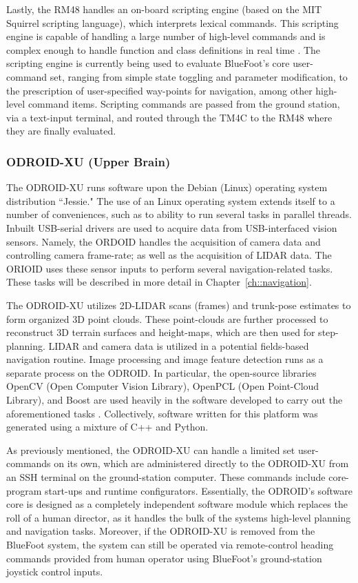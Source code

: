 			Lastly, the RM48 handles an on-board scripting engine (based on the MIT Squirrel scripting language), which interprets lexical commands. This scripting engine is capable of handling a large number of high-level commands and is complex enough to handle function and class definitions in real time \cite{Squirrel_website}. The scripting engine is currently being used to evaluate BlueFoot's core user-command set, ranging from simple state toggling and parameter modification, to the prescription of user-specified way-points for navigation, among other high-level command items. Scripting commands are passed from the ground station, via a text-input terminal, and routed through the TM4C to the RM48 where they are finally evaluated.

		\subsubsection{ODROID-XU (Upper Brain)}

			The ODROID-XU runs software upon the Debian (Linux) operating system distribution ``Jessie." The use of an Linux operating system extends itself to a number of conveniences, such as to ability to run several tasks in parallel threads. Inbuilt USB-serial drivers are used to acquire data from USB-interfaced vision sensors. Namely, the ORDOID handles the acquisition of camera data and controlling camera frame-rate; as well as the acquisition of LIDAR data. The ORIOID uses these sensor inputs to perform several navigation-related tasks. These tasks will be described in more detail in Chapter~\ref{ch::navigation}.

			The ODROID-XU utilizes 2D-LIDAR scans (frames) and trunk-pose estimates to form organized 3D point clouds. These point-clouds are further processed to reconstruct 3D terrain surfaces and height-maps, which are then used for step-planning. LIDAR and camera data is utilized in a potential fields-based navigation routine. Image processing and image feature detection runs as a separate process on the ODROID. In particular, the open-source libraries OpenCV (Open Computer Vision Library), OpenPCL (Open Point-Cloud Library), and Boost are used heavily in the software developed to carry out the aforementioned tasks \cite{opencv_library,openpcl_library,boost_website}. Collectively, software written for this platform was generated using a mixture of C++ and Python.

			As previously mentioned, the ODROID-XU can handle a limited set user-commands on its own, which are administered directly to the ODROID-XU from an SSH terminal on the ground-station computer. These commands include core-program start-ups and runtime configurators. Essentially, the ODROID's software core is designed as a completely independent software module which replaces the roll of a human director, as it handles the bulk of the systems high-level planning and navigation tasks. Moreover, if the ODROID-XU is removed from the BlueFoot system, the system can still be operated via remote-control heading commands provided from human operator using BlueFoot's ground-station joystick control inputs.
		
